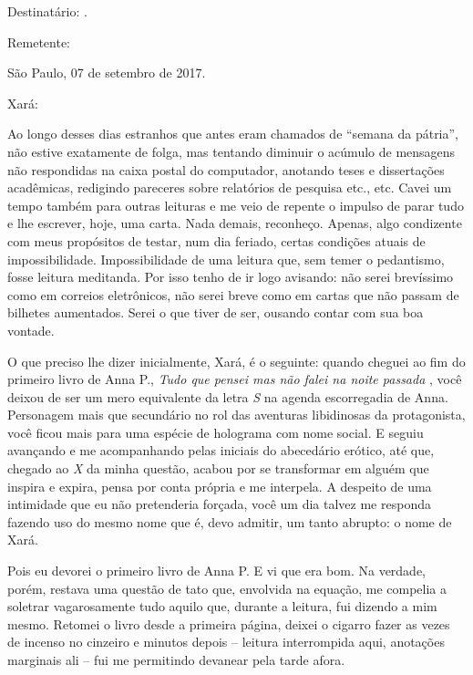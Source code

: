 

\noindent\dotfill

\noindent Destinatário: .

\noindent Remetente: 
\bigskip


\hfill São Paulo, 07 de setembro de 2017.
\medskip

\noindent Xará:
\smallskip

\noindent Ao longo desses dias estranhos que antes eram chamados de ``semana da
pátria'', não estive exatamente de folga, mas tentando diminuir o
acúmulo de mensagens não respondidas na caixa postal do computador,
anotando teses e dissertações acadêmicas, redigindo pareceres sobre
relatórios de pesquisa etc., etc. Cavei um tempo também para outras
leituras e me veio de repente o impulso de parar tudo e lhe escrever,
hoje, uma carta. Nada demais, reconheço. Apenas, algo condizente com
meus propósitos de testar, num dia feriado, certas condições atuais de
impossibilidade. Impossibilidade de uma leitura que, sem temer o
pedantismo, fosse leitura meditanda. Por isso tenho de ir logo avisando:
não serei brevíssimo como em correios eletrônicos, não serei breve como
em cartas que não passam de bilhetes aumentados. Serei o que tiver de
ser, ousando contar com sua boa vontade.

O que preciso lhe dizer inicialmente, Xará, é o seguinte: quando cheguei
ao fim do primeiro livro de Anna P., \emph{Tudo que pensei mas não falei
na noite passada} , você deixou de ser um mero equivalente da letra
\emph{S} na agenda escorregadia de Anna. Personagem mais que secundário
no rol das aventuras libidinosas da protagonista, você ficou mais para
uma espécie de holograma com nome social. E seguiu avançando e me
acompanhando pelas iniciais do abecedário erótico, até que, chegado ao
\emph{X} da minha questão, acabou por se transformar em alguém que
inspira e expira, pensa por conta própria e me interpela. A despeito de
uma intimidade que eu não pretenderia forçada, você um dia talvez me
responda fazendo uso do mesmo nome que é, devo admitir, um tanto
abrupto: o nome de Xará.

Pois eu devorei o primeiro livro de Anna P. E vi que era bom. Na
verdade, porém, restava uma questão de tato que, envolvida na equação,
me compelia a soletrar vagarosamente tudo aquilo que, durante a leitura,
fui dizendo a mim mesmo. Retomei o livro desde a primeira página, deixei
o cigarro fazer as vezes de incenso no cinzeiro e minutos depois --
leitura interrompida aqui, anotações marginais ali -- fui me permitindo
devanear pela tarde afora.

